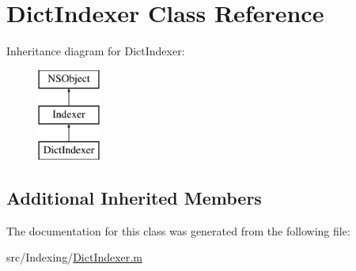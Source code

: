 \hypertarget{interface_dict_indexer}{\section{Dict\-Indexer Class Reference}
\label{interface_dict_indexer}
}
Inheritance diagram for Dict\-Indexer\-:\begin{figure}[H]
\begin{center}
\leavevmode
\includegraphics[height=3.000000cm]{interface_dict_indexer}
\end{center}
\end{figure}
\subsection*{Additional Inherited Members}


The documentation for this class was generated from the following file\-:\begin{DoxyCompactItemize}
\item 
src/\-Indexing/\hyperlink{_dict_indexer_8m}{Dict\-Indexer.\-m}\end{DoxyCompactItemize}
